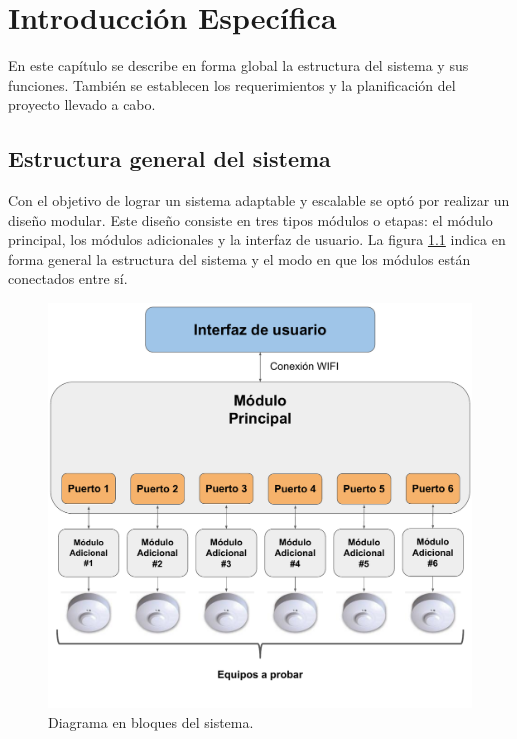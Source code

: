 \chapter{Introducción Específica} %

\label{Chapter2}

En este capítulo se describe en forma global la estructura del sistema y sus funciones. También se establecen los requerimientos y la planificación del proyecto llevado a cabo.

\section{Estructura general del sistema}
Con el objetivo de lograr un sistema adaptable y escalable se optó por realizar un diseño modular. Este diseño consiste en tres tipos módulos o etapas: el módulo principal, los módulos adicionales y la interfaz de usuario. La figura \ref{fig:BloquesGral} indica en forma general la estructura del sistema y el modo en que los módulos están conectados entre sí.


\begin{figure}[ht]
	\centering
	\includegraphics[scale=0.5]{./Figures/BloquesGral.pdf}
	\caption{Diagrama en bloques del sistema.}
	\label{fig:BloquesGral}
\end{figure}

